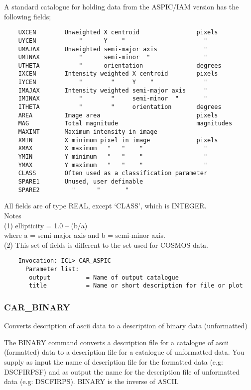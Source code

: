 A standard catalogue for holding data from the ASPIC/IAM version
has the following fields;
\begin{verbatim}
    UXCEN        Unweighted X centroid                pixels
    UYCEN            "      Y    "                      "
    UMAJAX       Unweighted semi-major axis             "
    UMINAX           "      semi-minor  "               "
    UTHETA           "      orientation               degrees
    IXCEN        Intensity weighted X centroid        pixels
    IYCEN            "        "     Y    "              "
    IMAJAX       Intensity weighted semi-major axis     "
    IMINAX           "        "     semi-minor  "       "
    ITHETA           "        "     orientation       degrees
    AREA         Image area                           pixels
    MAG          Total magnitude                      magnitudes
    MAXINT       Maximum intensity in image
    XMIN         X minimum pixel in image             pixels
    XMAX         X maximum   "   "    "                 "
    YMIN         Y minimum   "   "    "                 "
    YMAX         Y maximum   "   "    "                 "
    CLASS        Often used as a classification parameter
    SPARE1       Unused, user definable
    SPARE2         "      "       "
 \end{verbatim}
 All fields are of type REAL, except `CLASS', which is INTEGER.\\
 Notes\\
 (1)  ellipticity = 1.0 -- (b/a)\\
      where   a = semi-major axis and b = semi-minor axis.\\
 (2)  This set of fields is different to the set used for COSMOS data.
\begin{verbatim}
    Invocation: ICL> CAR_ASPIC
      Parameter list:
       output          = Name of output catalogue
       title           = Name or short description for file or plot
\end{verbatim}

\subsubsection{CAR\_BINARY}

Converts description of ascii data to a description of binary data (unformatted)

The BINARY command converts a description file for a catalogue of ascii
(formatted) data to a description file for a catalogue of unformatted data.
You supply as input the name of description file
for the formatted data (e.g: DSCFIRPSF) and as output the name for
the description file of unformatted data (e.g: DSCFIRPS).
BINARY is the inverse of ASCII.

